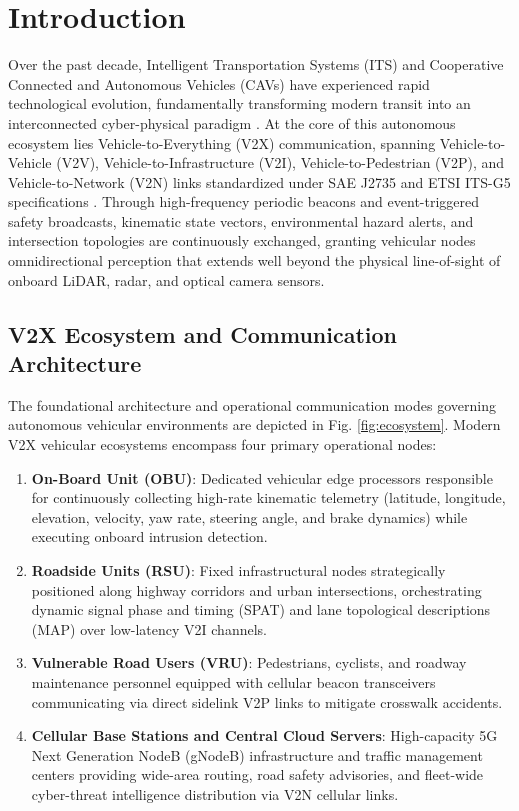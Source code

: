 \documentclass[conference]{IEEEtran}
\begin{document}
\section{Introduction}
Over the past decade, Intelligent Transportation Systems (ITS) and Cooperative Connected and Autonomous Vehicles (CAVs) have experienced rapid technological evolution, fundamentally transforming modern transit into an interconnected cyber-physical paradigm \cite{tabaa2020green, saurabh2022lbdmids}. At the core of this autonomous ecosystem lies Vehicle-to-Everything (V2X) communication, spanning Vehicle-to-Vehicle (V2V), Vehicle-to-Infrastructure (V2I), Vehicle-to-Pedestrian (V2P), and Vehicle-to-Network (V2N) links standardized under SAE J2735 and ETSI ITS-G5 specifications \cite{pourrahmani2022applications, rejeb2023unleashing}. Through high-frequency periodic beacons and event-triggered safety broadcasts, kinematic state vectors, environmental hazard alerts, and intersection topologies are continuously exchanged, granting vehicular nodes omnidirectional perception that extends well beyond the physical line-of-sight of onboard LiDAR, radar, and optical camera sensors.

\subsection{V2X Ecosystem and Communication Architecture}
The foundational architecture and operational communication modes governing autonomous vehicular environments are depicted in Fig. \ref{fig:ecosystem}. Modern V2X vehicular ecosystems encompass four primary operational nodes:
\begin{enumerate}
    \item \textbf{On-Board Unit (OBU)}: Dedicated vehicular edge processors responsible for continuously collecting high-rate kinematic telemetry (latitude, longitude, elevation, velocity, yaw rate, steering angle, and brake dynamics) while executing onboard intrusion detection.
    \item \textbf{Roadside Units (RSU)}: Fixed infrastructural nodes strategically positioned along highway corridors and urban intersections, orchestrating dynamic signal phase and timing (SPAT) and lane topological descriptions (MAP) over low-latency V2I channels.
    \item \textbf{Vulnerable Road Users (VRU)}: Pedestrians, cyclists, and roadway maintenance personnel equipped with cellular beacon transceivers communicating via direct sidelink V2P links to mitigate crosswalk accidents.
    \item \textbf{Cellular Base Stations and Central Cloud Servers}: High-capacity 5G Next Generation NodeB (gNodeB) infrastructure and traffic management centers providing wide-area routing, road safety advisories, and fleet-wide cyber-threat intelligence distribution via V2N cellular links.
\end{enumerate}
\end{document}
